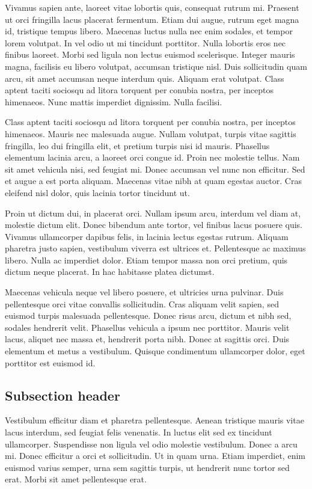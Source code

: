 \documentclass{article}
\begin{document}
Vivamus sapien ante, laoreet vitae lobortis quis, consequat rutrum mi. Praesent ut orci fringilla lacus placerat fermentum. Etiam dui augue, rutrum eget magna id, tristique tempus libero. Maecenas luctus nulla nec enim sodales, et tempor lorem volutpat. In vel odio ut mi tincidunt porttitor. Nulla lobortis eros nec finibus laoreet. Morbi sed ligula non lectus euismod scelerisque. Integer mauris magna, facilisis eu libero volutpat, accumsan tristique nisl. Duis sollicitudin quam arcu, sit amet accumsan neque interdum quis. Aliquam erat volutpat. Class aptent taciti sociosqu ad litora torquent per conubia nostra, per inceptos himenaeos. Nunc mattis imperdiet dignissim. Nulla facilisi.

Class aptent taciti sociosqu ad litora torquent per conubia nostra, per inceptos himenaeos. Mauris nec malesuada augue. Nullam volutpat, turpis vitae sagittis fringilla, leo dui fringilla elit, et pretium turpis nisi id mauris. Phasellus elementum lacinia arcu, a laoreet orci congue id. Proin nec molestie tellus. Nam sit amet vehicula nisi, sed feugiat mi. Donec accumsan vel nunc non efficitur. Sed et augue a est porta aliquam. Maecenas vitae nibh at quam egestas auctor. Cras eleifend nisl dolor, quis lacinia tortor tincidunt ut.

Proin ut dictum dui, in placerat orci. Nullam ipsum arcu, interdum vel diam at, molestie dictum elit. Donec bibendum ante tortor, vel finibus lacus posuere quis. Vivamus ullamcorper dapibus felis, in lacinia lectus egestas rutrum. Aliquam pharetra justo sapien, vestibulum viverra est ultrices et. Pellentesque ac maximus libero. Nulla ac imperdiet dolor. Etiam tempor massa non orci pretium, quis dictum neque placerat. In hac habitasse platea dictumst.

Maecenas vehicula neque vel libero posuere, et ultricies urna pulvinar. Duis pellentesque orci vitae convallis sollicitudin. Cras aliquam velit sapien, sed euismod turpis malesuada pellentesque. Donec risus arcu, dictum et nibh sed, sodales hendrerit velit. Phasellus vehicula a ipsum nec porttitor. Mauris velit lacus, aliquet nec massa et, hendrerit porta nibh. Donec at sagittis orci. Duis elementum et metus a vestibulum. Quisque condimentum ullamcorper dolor, eget porttitor est euismod id.

\subsection{Subsection header}

Vestibulum efficitur diam et pharetra pellentesque. Aenean tristique mauris vitae lacus interdum, sed feugiat felis venenatis. In luctus elit sed ex tincidunt ullamcorper. Suspendisse non ligula vel odio molestie vestibulum. Donec a arcu mi. Donec efficitur a orci et sollicitudin. Ut in quam urna. Etiam imperdiet, enim euismod varius semper, urna sem sagittis turpis, ut hendrerit nunc tortor sed erat. Morbi sit amet pellentesque erat.
\end{document}
